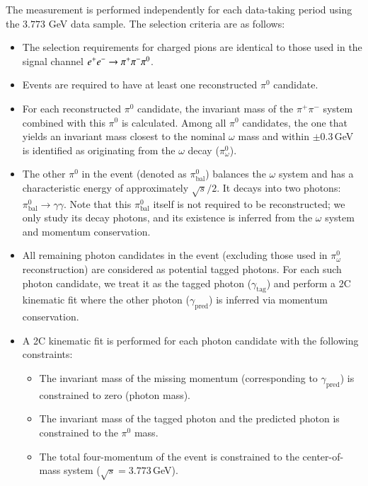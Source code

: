 The measurement is performed independently for each data-taking period using the $3.773$ GeV data sample. The selection criteria are as follows:
\begin{itemize}
    \item The selection requirements for charged pions are identical to those used in the signal channel $e^+e^- \rightarrow \pi^+\pi^-\pi^{0}$.

    \item Events are required to have at least one reconstructed $\pi^0$ candidate.

    \item For each reconstructed $\pi^0$ candidate, the invariant mass of the $\pi^+\pi^-$ system combined with this $\pi^0$ is calculated. Among all $\pi^0$ candidates, the one that yields an invariant mass closest to the nominal $\omega$ mass and within $\pm0.3$\,GeV is identified as originating from the $\omega$ decay ($\pi^0_{\omega}$).

    \item The other $\pi^0$ in the event (denoted as $\pi^0_{\text{bal}}$) balances the $\omega$ system and has a characteristic energy of approximately $\sqrt{s}/2$. It decays into two photons: $\pi^0_{\text{bal}} \to \gamma\gamma$. Note that this $\pi^0_{\text{bal}}$ itself is not required to be reconstructed; we only study its decay photons, and its existence is inferred from the $\omega$ system and momentum conservation.

    \item All remaining photon candidates in the event (excluding those used in $\pi^0_{\omega}$ reconstruction) are considered as potential tagged photons. For each such photon candidate, we treat it as the tagged photon ($\gamma_{\text{tag}}$) and perform a 2C kinematic fit where the other photon ($\gamma_{\text{pred}}$) is inferred via momentum conservation.

    \item A 2C kinematic fit is performed for each photon candidate with the following constraints:
          \begin{itemize}
              \item The invariant mass of the missing momentum (corresponding to $\gamma_{\text{pred}}$) is constrained to zero (photon mass).
              \item The invariant mass of the tagged photon and the predicted photon is constrained to the $\pi^0$ mass.
              \item The total four-momentum of the event is constrained to the center-of-mass system ($\sqrt{s} = 3.773$\,GeV).
          \end{itemize}


\end{itemize}
